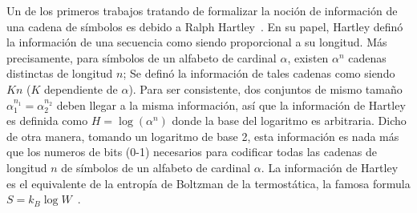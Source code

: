 \label{s:SZ:Entropia}


\label{sec:SZ:DefinicionShannon}

Un de los primeros trabajos  tratando de formalizar la noci\'on de informaci\'on
de  una cadena  de s\'imbolos  es debido  a Ralph  Hartley~\cite{Har28}.   En su
papel,  Hartley   defin\'o  la  informaci\'on  de  una   secuencia  como  siendo
proporcional a su longitud.  M\'as  precisamente, para s\'imbolos de un alfabeto
de cardinal $\alpha$, existen $\alpha^n$  cadenas distinctas de longitud $n$; Se
defin\'o la informaci\'on de tales cadenas como siendo $K n$ ($K$ dependiente de
$\alpha$).    Para   ser   consistente,   dos  conjuntos   de   mismo   tama\~no
$\alpha_1^{n_1} =  \alpha_2^{n_2}$ deben llegar a la  misma informaci\'on, as\'i
que  la informaci\'on  de  Hartley es  definida  como $H  = \log\left(  \alpha^n
\right)$  donde la  base del  logaritmo es  arbitraria.  Dicho  de  otra manera,
tomando un logaritmo de base 2, esta informaci\'on es nada m\'as que los numeros
de bits  (0-1) necesarios para  codificar todas las  cadenas de longitud  $n$ de
s\'imbolos de un  alfabeto de cardinal $\alpha$. La  informaci\'on de Hartley es
el  equivalente de la  entrop\'ia de  Boltzman de  la termost\'atica,  la famosa
formula $S = k_B \log W$~\cite{Bol96, Bol98, Jay65}.

